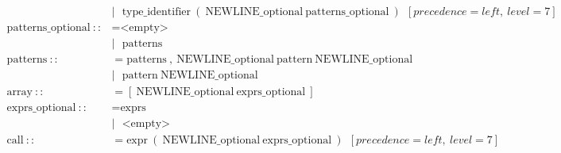 \documentclass{article}
\begin{document}
\begin{align*}
                                      & |\ \ \ \text{type\_identifier}\ (\ \text{NEWLINE\_optional}\ \text{patterns\_optional}\ )\ \ [precedence=left,\ level=7]                                                                                                  \\
  \text{patterns\_optional}\ ::       & = \text{<empty>}                                                                                                                                                                                                          \\
                                      & |\ \ \ \text{patterns}                                                                                                                                                                                                    \\
  \text{patterns}\ ::                 & = \text{patterns}\ ,\ \text{NEWLINE\_optional}\ \text{pattern}\ \text{NEWLINE\_optional}                                                                                                                                  \\
                                      & |\ \ \ \text{pattern}\ \text{NEWLINE\_optional}                                                                                                                                                                           \\
  \text{array}\ ::                    & = [\ \text{NEWLINE\_optional}\ \text{exprs\_optional}\ ]                                                                                                                                                                  \\
  \text{exprs\_optional}\ ::          & = \text{exprs}                                                                                                                                                                                                            \\
                                      & |\ \ \ \text{<empty>}                                                                                                                                                                                                     \\
  \text{call}\ ::                     & = \text{expr}\ (\ \text{NEWLINE\_optional}\ \text{exprs\_optional}\ )\ \ [precedence=left,\ level=7]                                                                                                                      \\

\end{align*}
\end{document}
